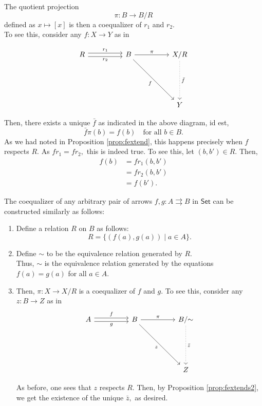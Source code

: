 \documentclass[11pt,leqno,landscape,semhelv]{seminar}
\theoremstyle{definition}
\numberwithin{joke}{section}
\numberwithin{thm}{section}
\numberwithin{equation}{section}
\newcommand{\tto}{\rightrightarrows}
\begin{document}
The quotient projection 
\begin{equation*} 
  \pi:B \to B/R
\end{equation*}
defined as $x \mapsto [x]$ is then a coequalizer of $r_1$ and $r_2.$\\
To see this, consider any $f:X \to Y$ as in

\begin{equation*} 
  \begin{tikzcd}
  R \arrow[rr, "r_1", shift left] \arrow[rr, "r_2"', shift right]&& 
  B \arrow[rr, "\pi"] \arrow[rrddd, "f"'] &  & X/R \arrow[ddd, "\bar{f}", dotted] \\&&&&\\&&&&\\
  &&&& Y  
  \end{tikzcd}
\end{equation*}

Then, there exists a unique $\bar{f}$ as indicated in the above diagram, id est, 
\begin{equation*}   
  \bar{f}\pi(b) = f(b) \quad \text{for all } b \in B.
\end{equation*}
As we had noted in Proposition \ref{prop:fextend}, this happens precisely when $f$ respects $R.$ As $fr_1 = fr_2,$ this is indeed true. To see this, let $(b, b') \in R.$ Then,
\begin{align*} 
  f(b) &= fr_1(b, b')\\
  &= fr_2(b, b')\\
  &= f(b').
\end{align*}

\exapmle{} The coequalizer of any arbitrary pair of arrows $f, g:A\tto B$ in $\mathsf{Set}$ can be constructed similarly as follows:
\begin{enumerate}
  \item Define a relation $R$ on $B$ as follows:
  \begin{equation*} 
    R = \{(f(a), g(a)) \mid a \in A\}.
  \end{equation*}
  \item Define $\sim$ to be the equivalence relation generated by $R.$\\
  Thus, $\sim$ is the equivalence relation generated by the equations $f(a) = g(a)$ for all $a \in A.$
  \item Then, $\pi:X \to X/R$ is a coequalizer of $f$ and $g.$ To see this, consider any $z:B \to Z$ as in
  \begin{equation*} 
    \begin{tikzcd}
    A \arrow[rr, "f", shift left] \arrow[rr, "g"', shift right] &  & B \arrow[rr, "\pi"] \arrow[rrddd, "z"'] &  & B/{\sim} \arrow[ddd, "\bar{z}", dotted] \\
    &&&&\\&&&&\\
    &&&& Z       
    \end{tikzcd}
  \end{equation*}

  As before, one sees that $z$ respects $R.$ Then, by Proposition \ref{prop:fextends2}, we get the existence of the unique $\bar{z},$ as desired.
\end{enumerate}

\end{document}
